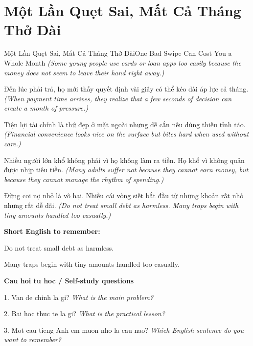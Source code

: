\section{Một Lần Quẹt Sai, Mất Cả Tháng Thở Dài}
\begin{truyen}{Một Lần Quẹt Sai, Mất Cả Tháng Thở Dài}{One Bad Swipe Can Cost You a Whole Month}
\textit{(Some young people use cards or loan apps too easily because the money does not seem to leave their hand right away.)}

Đến lúc phải trả, họ mới thấy quyết định vài giây có thể kéo dài áp lực cả tháng.
\textit{(When payment time arrives, they realize that a few seconds of decision can create a month of pressure.)}

Tiện lợi tài chính là thứ đẹp ở mặt ngoài nhưng dễ cắn nếu dùng thiếu tỉnh táo.
\textit{(Financial convenience looks nice on the surface but bites hard when used without care.)}

Nhiều người lớn khổ không phải vì họ không làm ra tiền. Họ khổ vì không quản được nhịp tiêu tiền.
\textit{(Many adults suffer not because they cannot earn money, but because they cannot manage the rhythm of spending.)}

\end{truyen}

\begin{baihoc}
Đừng coi nợ nhỏ là vô hại. Nhiều cái vòng siết bắt đầu từ những khoản rất nhỏ nhưng rất dễ dãi.
\textit{(Do not treat small debt as harmless. Many traps begin with tiny amounts handled too casually.)}
\end{baihoc}

\begin{ghinhoanh}
\textbf{Short English to remember:}

Do not treat small debt as harmless.

Many traps begin with tiny amounts handled too casually.

\end{ghinhoanh}

\begin{tuhocnhanh}
\textbf{Cau hoi tu hoc / Self-study questions}

1. Van de chinh la gi? \textit{What is the main problem?}

2. Bai hoc thuc te la gi? \textit{What is the practical lesson?}

3. Mot cau tieng Anh em muon nho la cau nao? \textit{Which English sentence do you want to remember?}
\end{tuhocnhanh}
\ngancach

